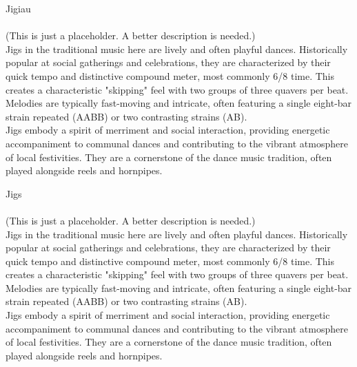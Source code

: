 \begin{multicols}{2}
    \Huge{Jigiau}\\
    \vspace{1cm}\\
    \normalsize{
      \noindent 
      (This is just a placeholder. A better description is needed.)\\

      Jigs in the traditional music here are lively and often playful dances. 
      Historically popular at social gatherings and celebrations, 
      they are characterized by their quick tempo and distinctive compound meter, 
      most commonly 6/8 time. This creates a characteristic "skipping" feel 
      with two groups of three quavers per beat. Melodies are typically fast-moving 
      and intricate, often featuring a single eight-bar strain repeated (AABB) 
      or two contrasting strains (AB).\\

      Jigs embody a spirit of merriment and social interaction, providing energetic 
      accompaniment to communal dances and contributing to the vibrant 
      atmosphere of local festivities. They are a cornerstone of the dance music 
      tradition, often played alongside reels and hornpipes.
    }

    \newcolumn

    \Huge{Jigs}\\
    \vspace{1cm}\\
    \normalsize{
      \noindent
      (This is just a placeholder. A better description is needed.)\\

      Jigs in the traditional music here are lively and often playful dances. 
      Historically popular at social gatherings and celebrations, 
      they are characterized by their quick tempo and distinctive compound meter, 
      most commonly 6/8 time. This creates a characteristic "skipping" feel 
      with two groups of three quavers per beat. Melodies are typically fast-moving 
      and intricate, often featuring a single eight-bar strain repeated (AABB) 
      or two contrasting strains (AB).\\

      Jigs embody a spirit of merriment and social interaction, providing energetic 
      accompaniment to communal dances and contributing to the vibrant 
      atmosphere of local festivities. They are a cornerstone of the dance music 
      tradition, often played alongside reels and hornpipes.
    }

    \end{multicols}